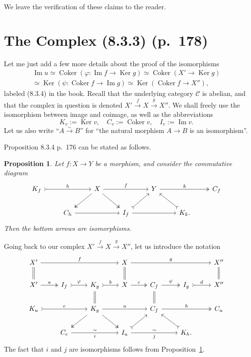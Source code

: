\documentclass[12pt]{article}
\newtheorem{prop}[thm]{Proposition}
\theoremstyle{remark}%
\newcommand{\C}{\mathcal C}
\newcommand{\p}{\varphi}
\newcommand{\bp}{\begin{prop}}
\newcommand{\ep}{\end{prop}}
\newcommand{\pr}{Proposition}
\DeclareMathOperator{\Coker}{Coker}
\DeclareMathOperator{\Ima}{Im}
\DeclareMathOperator{\Ker}{Ker}
\begin{document}
We leave the verification of these claims to the reader. 
%
\section{The Complex (8.3.3) (p.~178)} %
%
Let me just add a few more details about the proof of the isomorphisms
\begin{equation}\label{834}
\begin{split}
\Ima u\simeq\Coker(\p:\Ima f\to\Ker g)\simeq\Coker(X'\to\Ker g)\\ 
\simeq\Ker(\psi:\Coker f\to\Ima g)\simeq\Ker(\Coker f\to X''),
\end{split}
\end{equation}
labeled (8.3.4) in the book. Recall that the underlying category $\C$ is abelian, and that the complex in question is denoted $X'\xrightarrow{f}X\xrightarrow{g}X''$. We shall freely use the isomorphism between image and coimage, as well as the abbreviations 
$$
K_v:=\Ker v,\quad C_v:=\Coker v,\quad I_v:=\Ima v.
$$ 
Let us also write ``$A\overset{\sim}{\to}B$'' for ``the natural morphism $A\to B$ is an isomorphism''. 

Proposition 8.3.4 p.~176 can be stated as follows. 
%
\bp\label{p834}
Let $f:X\to Y$ be a morphism, and consider the commutative diagram 
$$
\begin{tikzcd}
K_f\ar[tail]{rr}{h}&&X\ar{rr}{f}\ar[two heads]{dl}\ar[two heads]{dr}&&Y\ar[two heads]{rr}{k}&&C_f\\ 
&C_h\ar{rr}&&I_f\ar[tail]{ur}\ar{rr}&&K_k.\ar[tail]{ul}
\end{tikzcd}
$$ 
Then the bottom arrows are isomorphisms.
\ep
% 
Going back to our complex $X'\overset{f}{\to}X\overset{g}{\to}X''$, let us introduce the notation 
$$
\begin{tikzcd}
X'\ar{rrr}{f}\ar[equal]{d}&&&X\ar[equal]{d}\ar{rrr}{g}&&&X''\ar[equal]{d}\\ 
X'\ar[two heads]{r}{a}&I_f\ar[tail]{r}{\p}&K_g\ar[equal]{d}\ar[tail]{r}{b}&X\ar[two heads]{r}{c}&C_f\ar[equal]{d}\ar[two heads]{r}{\psi}&I_g\ar[tail]{r}{d}&X''\\ 
K_u\ar[tail]{rr}{e}&&K_g\ar[two heads]{dl}\ar[two heads]{dr}\ar{rr}{u}&&C_f\ar[two heads]{rr}{h}&&C_u\\ 
&C_e\ar{rr}{\sim}[swap]{i}&&I_u\ar[tail]{ur}\ar{rr}{\sim}[swap]{j}&&K_h.\ar[tail]{ul}
\end{tikzcd}
$$ 
The fact that $i$ and $j$ are isomorphisms follows from \pr\ \ref{p834}. 
\end{document}
